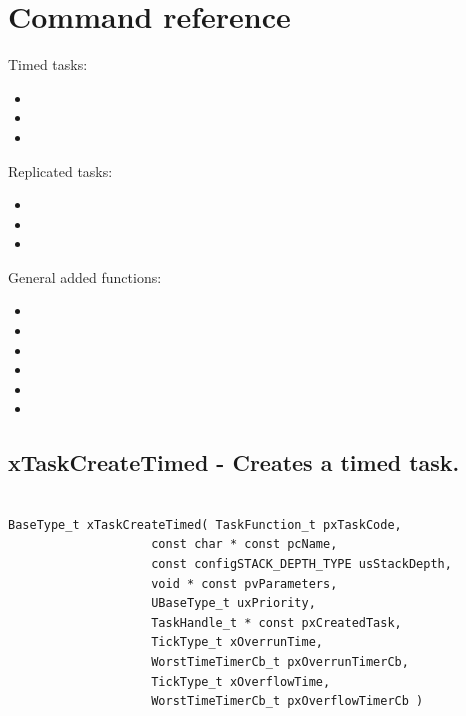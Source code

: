 \section{Command reference}

Timed tasks:
\begin{itemize}

    \item {}
    \item {}
    \item {}
    
\end{itemize}

\noindent Replicated tasks:
\begin{itemize}

    \item {}
    \item {}
    \item {}
    
\end{itemize}

\noindent General added functions:
\begin{itemize}

    \item {}
    \item {}
    \item {}
    \item {}
    \item {}
    \item {}
    
\end{itemize}

\subsection{xTaskCreateTimed -  Creates a timed task.}
\label{rt_cmd:xTaskCreateTimed}

\begin{verbatim}

BaseType_t xTaskCreateTimed( TaskFunction_t pxTaskCode,
                    const char * const pcName,
                    const configSTACK_DEPTH_TYPE usStackDepth,
                    void * const pvParameters,
                    UBaseType_t uxPriority,
                    TaskHandle_t * const pxCreatedTask,
                    TickType_t xOverrunTime,
                    WorstTimeTimerCb_t pxOverrunTimerCb,
                    TickType_t xOverflowTime,
                    WorstTimeTimerCb_t pxOverflowTimerCb )
            
\end{verbatim}

